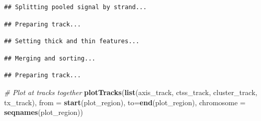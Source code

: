 \documentclass[9pt,a4paper,]{extarticle}
\newenvironment{Shaded}{\begin{snugshade}}{\end{snugshade}}
\newcommand{\KeywordTok}[1]{\textcolor[rgb]{0.13,0.29,0.53}{\textbf{{#1}}}}
\newcommand{\DataTypeTok}[1]{\textcolor[rgb]{0.13,0.29,0.53}{{#1}}}
\newcommand{\StringTok}[1]{\textcolor[rgb]{0.31,0.60,0.02}{{#1}}}
\newcommand{\CommentTok}[1]{\textcolor[rgb]{0.56,0.35,0.01}{\textit{{#1}}}}
\newcommand{\OtherTok}[1]{\textcolor[rgb]{0.56,0.35,0.01}{{#1}}}
\newcommand{\NormalTok}[1]{{#1}}
\begin{document}
\begin{verbatim}
## Splitting pooled signal by strand...
\end{verbatim}

\begin{verbatim}
## Preparing track...
\end{verbatim}

\begin{Shaded}
\end{Shaded}

\begin{verbatim}
## Setting thick and thin features...
\end{verbatim}

\begin{verbatim}
## Merging and sorting...
\end{verbatim}

\begin{verbatim}
## Preparing track...
\end{verbatim}

\begin{Shaded}
\begin{Highlighting}[]
\CommentTok{# Plot at tracks together}
\KeywordTok{plotTracks}\NormalTok{(}\KeywordTok{list}\NormalTok{(axis_track, }
                \NormalTok{ctss_track,}
                \NormalTok{cluster_track,}
                \NormalTok{tx_track),}
           \DataTypeTok{from =} \KeywordTok{start}\NormalTok{(plot_region), }
           \DataTypeTok{to=}\KeywordTok{end}\NormalTok{(plot_region), }
           \DataTypeTok{chromosome =} \KeywordTok{seqnames}\NormalTok{(plot_region))}
\end{Highlighting}
\end{Shaded}
\end{document}
